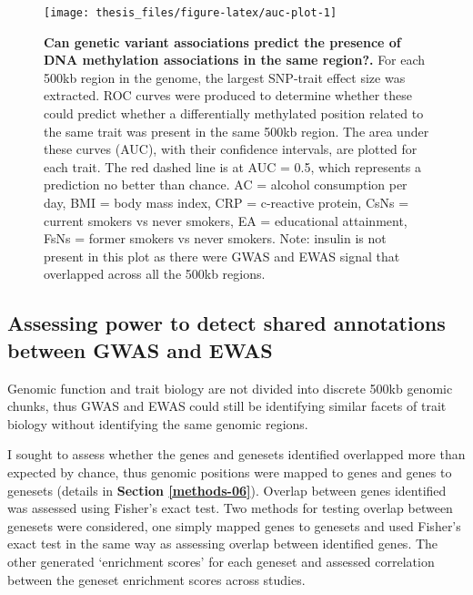 \documentclass[11pt,twoside]{bristolthesis}
\begin{document}
\begin{figure}

{\centering \texttt{[image: thesis\_files/figure-latex/auc-plot-1]} 

}

\caption[Can genetic variant associations predict the presence of DNA methylation associations in the same region?]{\textbf{Can genetic variant associations predict the presence of DNA methylation associations in the same region?.} For each 500kb region in the genome, the largest SNP-trait effect size was extracted. ROC curves were produced to determine whether these could predict whether a differentially methylated position related to the same trait was present in the same 500kb region. The area under these curves (AUC), with their confidence intervals, are plotted for each trait. The red dashed line is at AUC = 0.5, which represents a prediction no better than chance. AC = alcohol consumption per day, BMI = body mass index, CRP = c-reactive protein, CsNs = current smokers vs never smokers, EA = educational attainment, FsNs = former smokers vs never smokers. Note: insulin is not present in this plot as there were GWAS and EWAS signal that overlapped across all the 500kb regions.}\label{fig:auc-plot}
\end{figure}
\hypertarget{assessing-power-sims}{%
\subsection{Assessing power to detect shared annotations between GWAS and EWAS}\label{assessing-power-sims}}

Genomic function and trait biology are not divided into discrete 500kb genomic chunks, thus GWAS and EWAS could still be identifying similar facets of trait biology without identifying the same genomic regions.

I sought to assess whether the genes and genesets identified overlapped more than expected by chance, thus genomic positions were mapped to genes and genes to genesets (details in \textbf{Section \ref{methods-06}}). Overlap between genes identified was assessed using Fisher's exact test. Two methods for testing overlap between genesets were considered, one simply mapped genes to genesets and used Fisher's exact test in the same way as assessing overlap between identified genes. The other generated `enrichment scores' for each geneset and assessed correlation between the geneset enrichment scores across studies.
\end{document}
